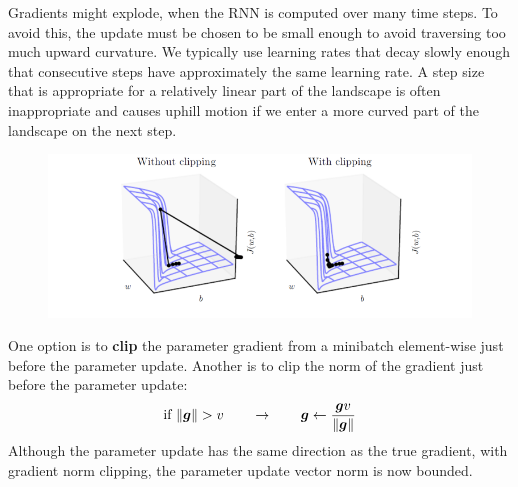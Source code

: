 \begin{multicols}{2}
	Gradients might explode, when the RNN is computed over many time steps.
	To avoid this, the update must be chosen to be small enough to avoid traversing too much upward curvature.
	We typically use learning rates that decay slowly enough that consecutive steps have approximately the same learning rate.
	A step size that is appropriate for a relatively linear part of the landscape is often inappropriate and causes uphill motion if we enter a more curved part of the landscape on the next step.
	\begin{figure}[H]
		\centering
		\includegraphics[width=0.9\linewidth]{images/clipping.png}
	\end{figure}
	One option is to \textbf{clip} the parameter gradient from a minibatch element-wise just before the parameter update.
	Another is to clip the norm of the gradient just before the parameter update:
	\[ \text{if } \lVert{\bm{g}}\rVert > v \qquad\rightarrow\qquad {\bm{g}} \leftarrow\frac{{\bm{g}} v}{\lVert{\bm{g}}\rVert} \]
	Although the parameter update has the same direction as the true gradient, with gradient norm clipping, the parameter update vector norm is now bounded.


\end{multicols}
